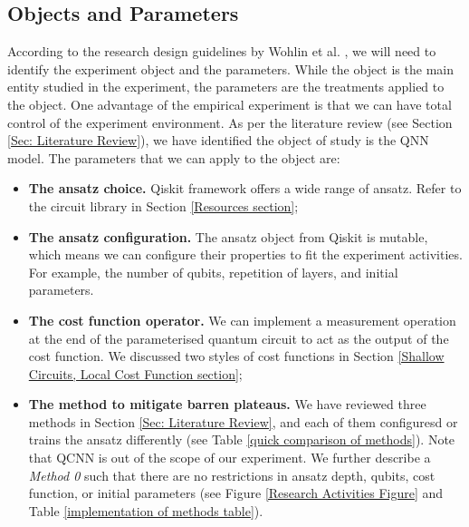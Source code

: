\subsection{Objects and Parameters}\label{Objects section}
According to the research design guidelines by Wohlin et al. \cite[ch 6]{wohlinExperimentationSoftwareEngineering2012}, we will need to identify the experiment object and the parameters.
While the object is the main entity studied in the experiment, the parameters are the treatments applied to the object.
One advantage of the empirical experiment is that we can have total control of the experiment environment.
As per the literature review (see Section \ref{Sec: Literature Review}), we have identified the object of study is the QNN model.
The parameters that we can apply to the object are:
\begin{itemize}
    \item \textbf{The ansatz choice.} Qiskit framework offers a wide range of ansatz. Refer to the circuit library in Section \ref{Resources section};
    \item \textbf{The ansatz configuration.} The ansatz object from Qiskit is mutable, which means we can configure their properties to fit the experiment activities. For example, the number of qubits, repetition of layers, and initial parameters.
    \item \textbf{The cost function operator.} We can implement a measurement operation at the end of the parameterised quantum circuit to act as the output of the cost function. We discussed two styles of cost functions in Section \ref{Shallow Circuits, Local Cost Function section};
    \item \textbf{The method to mitigate barren plateaus.} We have reviewed three methods in Section \ref{Sec: Literature Review}, and each of them configuresd or trains the ansatz differently (see Table \ref{quick comparison of methods}). Note that QCNN is out of the scope of our experiment. We further describe a \emph{Method 0} such that there are no restrictions in ansatz depth, qubits, cost function, or initial parameters (see Figure \ref{Research Activities Figure} and Table \ref{implementation of methods table}).
\end{itemize}